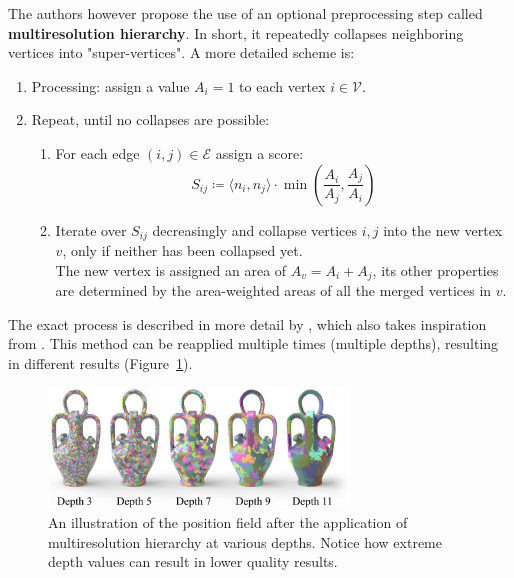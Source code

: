 \documentclass{ACGSeminar}
\begin{document}
The authors however propose the use of an optional preprocessing step called \textbf{multiresolution hierarchy}. In short, it repeatedly collapses neighboring vertices into "super-vertices". A more detailed scheme is:
\begin{enumerate}
	\item	Processing: assign a value $A_i = 1$ to each vertex $i \in \mathcal{V}$.
	\item	Repeat, until no collapses are possible:
			\begin{enumerate}
				\item	For each edge $(i,j) \in \mathcal{E}$ assign a score:
						\begin{equation*}
							S_{ij} \coloneqq \langle n_i, n_j \rangle \cdot \min\left(\frac{A_i}{A_j}, \frac{A_j}{A_i}\right)
						\end{equation*}
				\item	Iterate over $S_{ij}$ decreasingly and collapse vertices $i,j$ into the new vertex $v$, only if neither has been collapsed yet.\\
						The new vertex is assigned an area of $A_v = A_i + A_j$, its other properties are determined by the area-weighted areas of all the merged vertices in $v$.
			\end{enumerate}
\end{enumerate}
The exact process is described in more detail by \cite{jakob2015instant}, which also takes inspiration from \cite{botsch2006primo}. This method can be reapplied multiple times (multiple depths), resulting in different results (Figure~\ref{fig:multireolution-hierarchy-depths}).

\begin{figure}[htb!]
	\begin{centering}
		\includegraphics[width=8cm]{img/multiresolution-hierarchy-depths.png}\par
	\end{centering}
	\caption{An illustration of the position field after the application of multiresolution hierarchy at various depths. Notice how extreme depth values can result in lower quality results. \cite{jakob2015instant}}
	\label{fig:multireolution-hierarchy-depths}
\end{figure}
\end{document}

